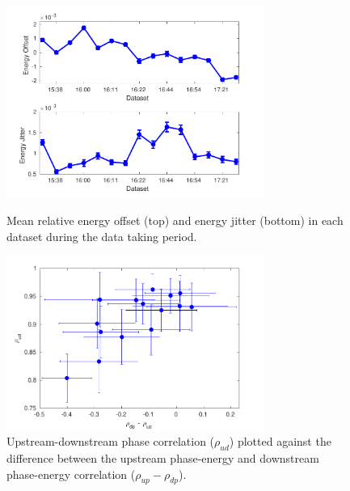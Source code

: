 \begin{figure}
  \centering
  \includegraphics[width=0.75\textwidth]{Figures/feedforward/enOffsetJitter}
  \caption{Mean relative energy offset (top) and energy jitter (bottom) in each dataset during the data taking period.}
  \label{f:longFF_enDrifts}
  \includegraphics[width=0.75\textwidth]{Figures/feedforward/enCorrVsPhasCorr}
  \caption{Upstream-downstream phase correlation (\(\rho_{ud}\)) plotted against the difference between the upstream phase-energy and downstream phase-energy correlation (\(\rho_{up} - \rho_{dp}\)).}
  \label{f:enCorrVsPhasCorr}
\end{figure}


